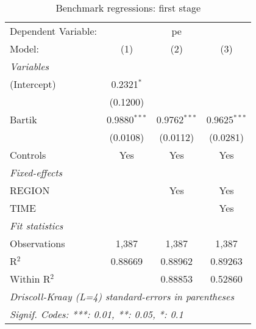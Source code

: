 
\begin{table}[htbp]
   \caption{Benchmark regressions: first stage}
   \centering
   \begin{tabular}{lccc}
      \tabularnewline \midrule \midrule
      Dependent Variable: & \multicolumn{3}{c}{pe}\\
      Model:       & (1)            & (2)            & (3)\\  
      \midrule
      \emph{Variables}\\
      (Intercept)  & 0.2321$^{*}$   &                &   \\   
                   & (0.1200)       &                &   \\   
      Bartik       & 0.9880$^{***}$ & 0.9762$^{***}$ & 0.9625$^{***}$\\   
                   & (0.0108)       & (0.0112)       & (0.0281)\\   
      Controls     & Yes            & Yes            & Yes\\  
      \midrule
      \emph{Fixed-effects}\\
      REGION       &                & Yes            & Yes\\  
      TIME         &                &                & Yes\\  
      \midrule
      \emph{Fit statistics}\\
      Observations & 1,387          & 1,387          & 1,387\\  
      R$^2$        & 0.88669        & 0.88962        & 0.89263\\  
      Within R$^2$ &                & 0.88853        & 0.52860\\  
      \midrule \midrule
      \multicolumn{4}{l}{\emph{Driscoll-Kraay (L=4) standard-errors in parentheses}}\\
      \multicolumn{4}{l}{\emph{Signif. Codes: ***: 0.01, **: 0.05, *: 0.1}}\\
   \end{tabular}
\end{table}


